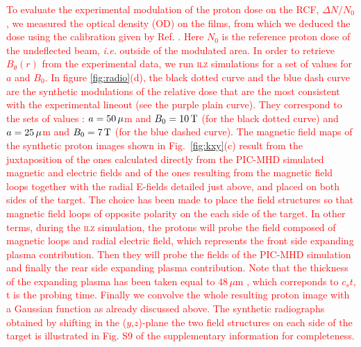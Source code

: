 \documentclass[aps,twocolumn,showpacs,superscriptaddress]{revtex4}
\begin{document}
\textcolor{red}{
To evaluate the experimental modulation of the proton dose on the RCF, $\Delta N/N_0$, we measured the optical density (OD) on the films, from which we deduced the dose using the calibration given by Ref. \cite{RSI_Chen_2016}. Here $N_0$ is the reference proton dose of the undeflected beam, \emph{i.e.} outside of the modulated area. In order to retrieve  $B_\theta(r)$ from the experimental data, we run \textsc{ilz} simulations for a set of values for $a$ and $B_0$. In figure \ref{fig:radio}(d), the black dotted curve and the blue dash curve are the synthetic modulations of the relative dose that are the most consistent with the experimental lineout (see the purple plain curve). They correspond to the  sets of values : $a=50\,\rm \mu$m and $B_0=10\,\rm T$ (for the black dotted curve) and $a=25\,\rm \mu$m and $B_0=7\,\rm T$ (for the blue dashed curve).
%
The magnetic field maps of the synthetic proton images shown in Fig.~\ref{fig:kxy}(c) result from the juxtaposition of the ones calculated directly from the PIC-MHD simulated magnetic \textcolor{red}{and electric} fields and of the ones resulting from the magnetic field loops together with the radial E-fields detailed just above, and placed on both sides of the target.
The choice has been made to place the field structures so that  magnetic field loops of opposite polarity on the each side of the target.
%
In other terms, during the \textsc{ilz} simulation, the protons will probe the field composed of magnetic loops and \textcolor{red}{radial electric field}, which represents the front side expanding plasma contribution. Then they will probe  the fields of the PIC-MHD simulation and finally the rear side expanding plasma contribution.  Note that the thickness of the expanding plasma has been taken equal to $ 48 \, \mu$m , which correponds to $c_s t $, t is the probing time. Finally we convolve the whole resulting proton image with a Gaussian function as already discussed above. 
The synthetic radiographs obtained by shifting in the ($y$,$z$)-plane the two field structures on each side of the target is illustrated in Fig. S9 of the supplementary information for completeness. 
}
\end{document}

